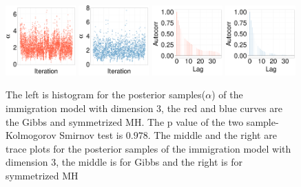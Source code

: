   \begin{figure}[H]
  \centering
  \begin{minipage}[!hp]{0.99\linewidth}
    \includegraphics [width=0.24\textwidth, angle=0]{figs/Q_ks/q_traceGBS_20_03_3_.pdf}
    \includegraphics [width=0.24\textwidth, angle=0]{figs/Q_ks/q_traceMH_20_03_3_.pdf}
    \includegraphics [width=0.24\textwidth, angle=0]{figs/Q_ks/q_gbsacf_20_03_3_.pdf}
    \includegraphics [width=0.24\textwidth, angle=0]{figs/Q_ks/q_mhacf_20_03_3_.pdf}
  \end{minipage}

    \caption{The left is histogram for the posterior samples($\alpha$) of the immigration model with dimension 3, the red and blue curves are the Gibbs and symmetrized MH. The p value of the two sample-Kolmogorov Smirnov test is $ 0.978$. The middle and the right are trace plots for the posterior samples of the immigration model with dimension 3, the middle is for Gibbs and the right is for symmetrized MH}
     \label{fig:TRACE_Q}
  \end{figure}
  

